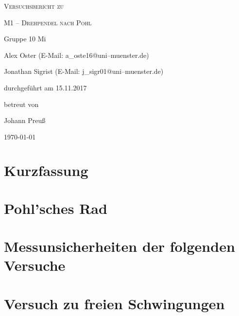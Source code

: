 \documentclass[11pt,a4paper,titlepage, ngerman]{article}
\begin{document}
	\begin{titlepage}
		
		\centering
		{\scshape\LARGE Versuchsbericht zu \par}
		\vspace{1cm}
		{\scshape\huge M1 -- Drehpendel nach Pohl\par}
		\vspace{2.5cm}
		{\LARGE Gruppe 10 Mi\par}
		\vspace{0.5cm}
		{\large Alex Oster (E-Mail: a\_oste16@uni--muenster.de) \par}
		{\large Jonathan Sigrist (E-Mail: j\_sigr01@uni--muenster.de) \par}
		\vfill
		durchgeführt am 15.11.2017\par
		betreut von\par
		{\large Johann Preuß}		
		\vfill	
		{\large \today\par}
		
	\end{titlepage}
		
	\tableofcontents
		
	\newpage
	
	\section{Kurzfassung}
		
		
		\section{Pohl'sches Rad}
		
		
		\section{Messunsicherheiten der folgenden Versuche}
		
		
		\section{Versuch zu freien Schwingungen}
			
\end{document}
